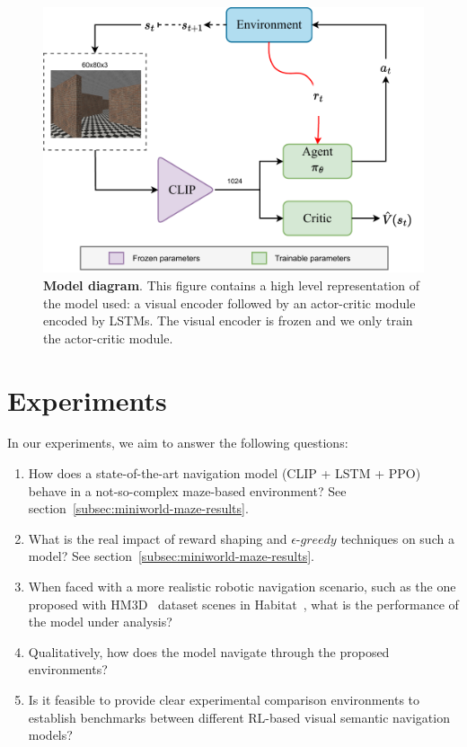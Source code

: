 \begin{figure}
    \centering
    \includegraphics[width=\linewidth]{figures/understanding_vsn/network_clip_diagram}
    \caption{\textbf{Model diagram}. This figure contains a high level representation of the model used: a visual encoder followed by an actor-critic module encoded by LSTMs. The visual encoder is frozen and we only train the actor-critic module.}
    \label{fig:network_clip_diagram}
\end{figure}

\section{Experiments}
\label{sec:experiments}

In our experiments, we aim to answer the following questions:
\begin{enumerate}
    \item How does a state-of-the-art navigation model (CLIP + LSTM + PPO) behave in a not-so-complex maze-based environment?
    See section~\ref{subsec:miniworld-maze-results}.
    \item What is the real impact of reward shaping and $\epsilon\text{-}greedy$ techniques on such a model?
    See section~\ref{subsec:miniworld-maze-results}.
    \item When faced with a more realistic robotic navigation scenario, such as the one proposed with HM3D~\cite{ramakrishnan2021} dataset scenes in Habitat~\cite{szot2021}, what is the performance of the model under analysis?
    \item Qualitatively, how does the model navigate through the proposed environments?
    \item Is it feasible to provide clear experimental comparison environments to establish benchmarks between different RL-based visual semantic navigation models?
\end{enumerate}

